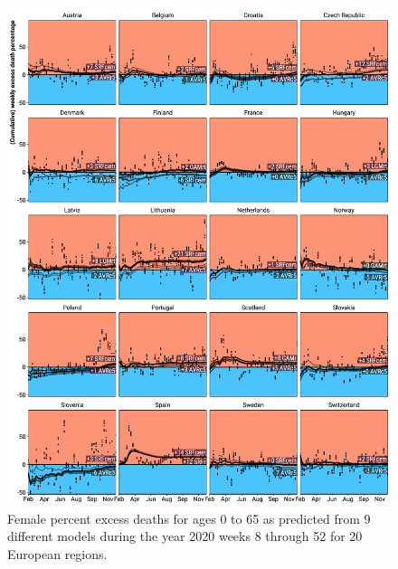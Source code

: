 \documentclass[12pt]{article}
\begin{document}
\begin{appendix}

\begin{figure}
\caption{
Female percent excess deaths for ages 0 to 65 as predicted from 9 different models during the year 2020 weeks 8 through 52 for 20 European regions.}
\label{fig:excessf0to65}
\includegraphics{excess_female__0_65_.pdf}
\end{figure}


\end{appendix}
\end{document}
